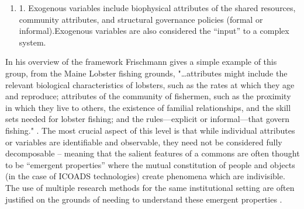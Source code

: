 \begin{enumerate}
\item 
1. Exogenous variables include biophysical attributes of
the shared resources, community attributes, and structural governance
policies (formal or informal).Exogenous variables are also considered
the ``input'' to a complex system.\\ 
\end{enumerate}

In his overview of the framework
Frischmann gives a simple example of this group, from the Maine Lobster
fishing grounds, "\ldots{}attributes might include the relevant
biological characteristics of lobsters, such as the rates at which they
age and reproduce; attributes of the community of fishermen, such as the
proximity in which they live to others, the existence of familial
relationships, and the skill sets needed for lobster fishing; and the
rules---explicit or informal---that govern fishing." \citep{frischmann2013two}. The most crucial aspect of this level is that while individual
attributes or variables are identifiable and observable, they need not
be considered fully decomposable \citep{ostrom2009understanding} -- meaning that the
salient features of a commons are often thought to be ``emergent
properties'' where the mutual constitution of people and objects (in the
case of ICOADS technologies) create phenomena which are indivisible. The
use of multiple research methods for the same institutional setting are
often justified on the grounds of needing to understand these emergent
properties \citep{ostrom2009understanding}.\\

